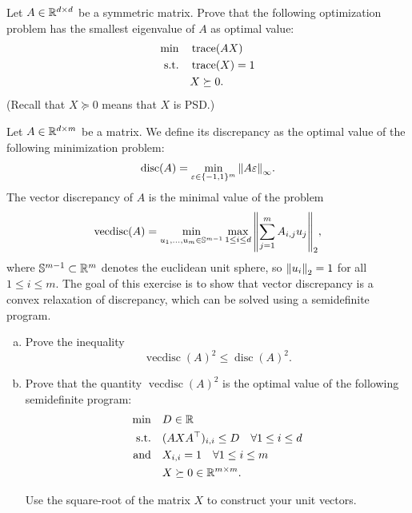 \begin{myexercise}
    \label{prob:smallest_eigenvalue}

Let $A \in \mathbb{R}^{d \times d}$ be a symmetric matrix. Prove that the following optimization problem has the smallest eigenvalue of $A$ as optimal value:
\begin{align*}
        \min \quad &\operatorname{trace}(AX) \\
        \text{s.t.}\quad &\operatorname{trace}(X) = 1 \\
        &X\succeq 0.
        \end{align*}
(Recall that $X \succeq 0$ means that $X$ is PSD.)
\end{myexercise}


\begin{myexercise}
    \label{prob:discrepancy_relaxation}
    
    Let $A \in \mathbb{R}^{d \times m}$ be a matrix. We define its discrepancy as the optimal value of the following minimization problem:
    $$ \operatorname{disc}(A) = \min_{\varepsilon \in \{-1,1\}^m} {\left\lVert{A \varepsilon}\right\rVert}_{\infty}.$$
    The vector discrepancy of $A$ is the minimal value of the problem
    $$ \operatorname{vecdisc}(A) = \min_{u_1, \ldots, u_m \in \mathbb{S}^{m-1}} \max_{1 \leq i \leq d} {\left\lVert{ \sum_{j=1}^m A_{i,j}u_j}\right\rVert}_2,$$
    where $\mathbb{S}^{m-1} \subset \mathbb{R}^m$ denotes the euclidean unit sphere, so ${\left\lVert{u_i}\right\rVert}_2 = 1$ for all $1\leq i \leq m$. The goal of this exercise is to show that vector discrepancy is a convex relaxation of discrepancy, which can be solved using a semidefinite program.
    \begin{enumerate}[(a)]
        \item Prove the inequality
        $$ \operatorname{vecdisc}(A)^2 \leq \operatorname{disc}(A)^2.$$
        \item Prove that the quantity $\operatorname{vecdisc}(A)^2$ is the optimal value of the following semidefinite program:
        \begin{align*}
        \min \quad &D \in \mathbb{R}\\
        \text{s.t.}\quad &(AXA^\top)_{i,i} \leq D \quad \forall 1 \leq i \leq d  \\
        \text{and} \quad &X_{i,i} = 1 \quad \forall 1 \leq i \leq m \\
        &X\succeq 0 \in \mathbb{R}^{m \times m}.
        \end{align*}
    \begin{hint}
        Use the square-root of the matrix $X$ to construct your unit vectors.
    \end{hint}
    \end{enumerate}
    
\end{myexercise}


